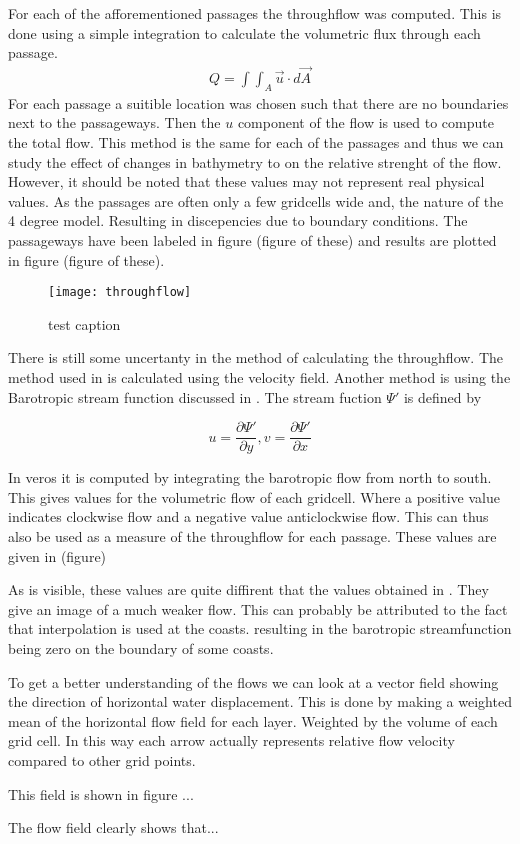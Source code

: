 For each of the afforementioned passages the throughflow was computed. This is done using a simple integration to calculate the volumetric flux through each passage.
\begin{align}
	Q = \int \int_A \vec{u} \cdot d\vec{A}
\end{align}	
For each passage a suitible location was chosen such that there are no boundaries next to the passageways. Then the $u$ component of the flow is used to compute the total flow. This method is the same for each of the passages and thus we can study the effect of changes in bathymetry to on the relative strenght of the flow. However, it should be noted that these values may not represent real physical values. As the passages are often only a few gridcells wide and, the nature of the 4 degree model. Resulting in discepencies due to boundary conditions. The passageways have been labeled in figure (figure of these) and results are plotted in figure (figure of these).

\begin{figure}[H]
	\texttt{[image: throughflow]}
	\caption{test caption}
	\label{fig:throughflow}
\end{figure}

There is still some uncertanty in the method of calculating the throughflow. The method used in  is calculated using the velocity field. Another method is using the Barotropic stream function discussed in . The stream fuction $\Psi'$ is defined by


$$
u = \frac{\partial \Psi'}{\partial y}, v = \frac{\partial \Psi'}{\partial x}
$$

In veros it is computed by integrating the barotropic flow from north to south. This gives values for the volumetric flow of each gridcell. Where a positive value indicates clockwise flow and a negative value anticlockwise flow. This can thus also be used as a measure of the throughflow for each passage. These values are given in (figure)

As is visible, these values are quite diffirent that the values obtained in .
They give an image of a much weaker flow. This can probably be attributed to the fact that interpolation is used at the coasts. resulting in the barotropic streamfunction being zero on the boundary of some coasts.


To get a better understanding of the flows we can look at a vector field showing the direction of horizontal water displacement. This is done by making a weighted mean of the horizontal flow field for each layer. Weighted by the volume of each grid cell. In this way each arrow actually represents relative flow velocity compared to other grid points.

This field is shown in figure ...


The flow field clearly shows that...